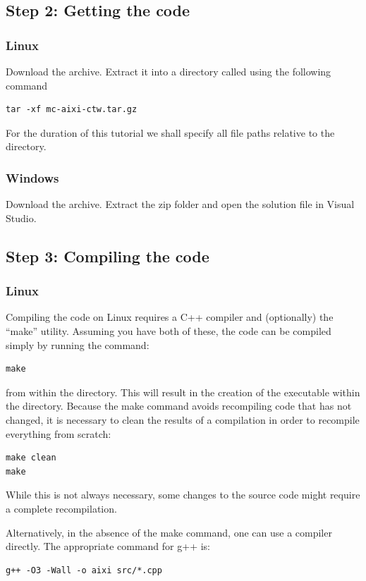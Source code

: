 \documentclass[a4paper,11pt]{article}
\begin{document}
\subsection{Step 2: Getting the code}


\subsubsection{Linux}
Download the archive. Extract it into a directory called  using the following command
\begin{lstlisting}[frame=single]
tar -xf mc-aixi-ctw.tar.gz
\end{lstlisting} %
For the duration of this tutorial we shall specify all file paths relative to the  directory.


\subsubsection{Windows}
Download the archive. Extract the zip folder and open the solution file  in Visual Studio.


\subsection{Step 3: Compiling the code}
\subsubsection{Linux}
Compiling the code on Linux requires a C++ compiler and (optionally) the ``make'' utility. Assuming you have both of these, the code can be compiled simply by running the command:
\begin{lstlisting}[frame=single]
make
\end{lstlisting}
from within the  directory. This will result in the creation of the  executable within the  directory. Because the make command avoids recompiling code that has not changed, it is necessary to clean the results of a compilation in order to recompile everything from scratch:
\begin{lstlisting}[frame=single]
make clean
make
\end{lstlisting}
While this is not always necessary, some changes to the source code might require a complete recompilation.

Alternatively, in the absence of the make command, one can use a compiler directly. The appropriate command for g++ is:
\begin{lstlisting}[frame=single]
g++ -O3 -Wall -o aixi src/*.cpp
\end{lstlisting}
\end{document}
